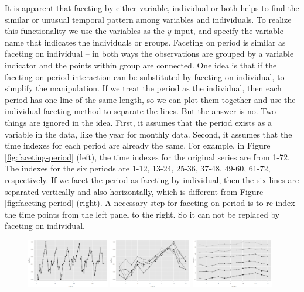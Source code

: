 \documentclass[12pt]{article}
\begin{document}
\begin{itemize}
It is apparent that faceting by either variable, individual or both
helps to find the similar or unusual temporal pattern among variables
and individuals. To realize this functionality we use the variables
as the $y$ input, and specify the variable name that indicates the individuals
or groups. Faceting on period is similar as faceting on individual
-- in both ways the observations are grouped by a variable indicator
and the points within group are connected. One idea is that if the
faceting-on-period interaction can be substituted by faceting-on-individual,
to simplify the manipulation. If we treat the period as the individual,
then each period has one line of the same length, so we can plot them
together and use the individual faceting method to separate the lines.
But the answer is no. Two things are ignored in the idea. First, it
assumes that the period exists as a variable in the data, like the
year for monthly data. Second, it assumes that the time indexes for
each period are already the same. For example, in Figure \ref{fig:faceting-period} (left),
the time indexes for the original series are from 1-72. The indexes
for the six periods are 1-12, 13-24, 25-36, 37-48, 49-60, 61-72, respectively.
If we facet the period as faceting by individual, then the six lines
are separated vertically and also horizontally, which is different
from Figure \ref{fig:faceting-period} (right). A necessary step for
faceting on period is to re-index the time points from the left panel
to the right. So it can not be replaced by faceting on individual.


\begin{center}
\begin{figure}[H]
\begin{centering}
\includegraphics[width=0.32\textwidth]{graph/pipeline-01-1}
\includegraphics[width=0.32\textwidth]{graph/pipeline-15-5}
\includegraphics[width=0.32\textwidth]{graph/pipeline-15-3}
\par\end{centering}


\end{figure}
\end{center}
\end{itemize}
\end{document}
